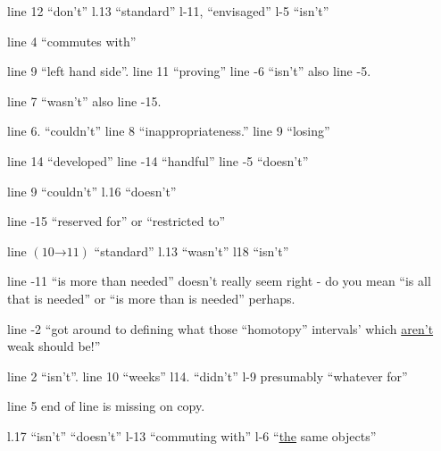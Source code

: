 \hangindent=1.2cm line 12 ``don't'' l.13 ``standard'' l-11, ``envisaged'' l-5 ``isn't''

\hangindent=1.2cm line 4 ``commutes with''

\hangindent=1.2cm line 9 ``left hand side''. line 11 ``proving'' line -6 ``isn't'' also line -5.

\hangindent=1.2cm line 7 ``wasn't'' also line -15.

\hangindent=1.2cm line 6. ``couldn't'' line 8 ``inappropriateness.'' line 9 ``losing''

\hangindent=1.2cm \hspace*{1.2cm}line 14 ``developed'' line -14 ``handful'' line -5 ``doesn't''

\hangindent=1.2cm line 9 ``couldn't'' l.16 ``doesn't''

\hangindent=1.2cm line -15 ``reserved for'' or ``restricted to''
\reversemarginpar{}\normalmarginpar

\hangindent=1.2cm line $(10\mathord{\to}11)$ ``standard'' l.13 ``wasn't'' l18 ``isn't''

\hangindent=1.2cm \hspace*{1.2cm}line -11 ``is more than needed'' doesn't really seem right - do you mean ``is all that is needed'' or ``is more than is needed'' perhaps.

\hangindent=1.2cm \hspace*{1.2cm}line -2 ``got around to defining  what those ``homotopy'' intervals' which \uline{aren't} weak should be!''

\hangindent=1.2cm line 2 ``isn't''. line 10 ``weeks'' l14. ``didn't'' l-9 presumably ``whatever for''

\hangindent=1.2cm \hspace*{1.2cm}line 5  end of line is missing on copy.

\hangindent=1.2cm l.17 ``isn't'' ``doesn't'' l-13 ``commuting with'' l-6 ``\uline{the} same objects''

